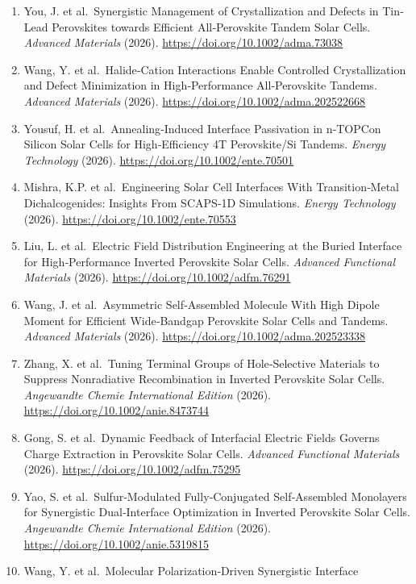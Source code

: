 \documentclass[
  11pt,
]{article}
\begin{document}
\begin{enumerate}
{  environment materials} (2026).
  \url{https://doi.org/10.1002/eem2.70453}
\item
  You, J. et al.~Synergistic Management of Crystallization and Defects
  in Tin‐Lead Perovskites towards Efficient All‐Perovskite Tandem Solar
  Cells. \emph{Advanced Materials} (2026).
  \url{https://doi.org/10.1002/adma.73038}
\item
  Wang, Y. et al.~Halide‐Cation Interactions Enable Controlled
  Crystallization and Defect Minimization in High‐Performance
  All‐Perovskite Tandems. \emph{Advanced Materials} (2026).
  \url{https://doi.org/10.1002/adma.202522668}
\item
  Yousuf, H. et al.~Annealing‐Induced Interface Passivation in n‐TOPCon
  Silicon Solar Cells for High‐Efficiency 4T Perovskite/Si Tandems.
  \emph{Energy Technology} (2026).
  \url{https://doi.org/10.1002/ente.70501}
\item
  Mishra, K.P. et al.~Engineering Solar Cell Interfaces With
  Transition‐Metal Dichalcogenides: Insights From SCAPS‐1D Simulations.
  \emph{Energy Technology} (2026).
  \url{https://doi.org/10.1002/ente.70553}
\item
  Liu, L. et al.~Electric Field Distribution Engineering at the Buried
  Interface for High‐Performance Inverted Perovskite Solar Cells.
  \emph{Advanced Functional Materials} (2026).
  \url{https://doi.org/10.1002/adfm.76291}
\item
  Wang, J. et al.~Asymmetric Self‐Assembled Molecule With High Dipole
  Moment for Efficient Wide‐Bandgap Perovskite Solar Cells and Tandems.
  \emph{Advanced Materials} (2026).
  \url{https://doi.org/10.1002/adma.202523338}
\item
  Zhang, X. et al.~Tuning Terminal Groups of Hole‐Selective Materials to
  Suppress Nonradiative Recombination in Inverted Perovskite Solar
  Cells. \emph{Angewandte Chemie International Edition} (2026).
  \url{https://doi.org/10.1002/anie.8473744}
\item
  Gong, S. et al.~Dynamic Feedback of Interfacial Electric Fields
  Governs Charge Extraction in Perovskite Solar Cells. \emph{Advanced
  Functional Materials} (2026). \url{https://doi.org/10.1002/adfm.75295}
\item
  Yao, S. et al.~Sulfur‐Modulated Fully‐Conjugated Self‐Assembled
  Monolayers for Synergistic Dual‐Interface Optimization in Inverted
  Perovskite Solar Cells. \emph{Angewandte Chemie International Edition}
  (2026). \url{https://doi.org/10.1002/anie.5319815}
\item
  Wang, Y. et al.~Molecular Polarization‐Driven Synergistic Interface

\end{enumerate}
\end{document}

